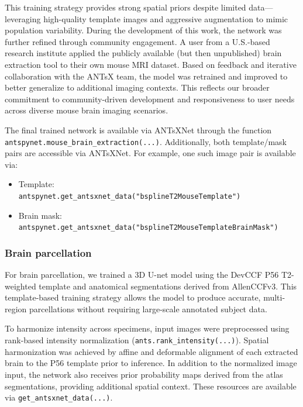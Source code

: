 \documentclass[
  12pt,
]{article}
\providecommand{\tightlist}{%
  \setlength{\itemsep}{0pt}\setlength{\parskip}{0pt}}
\begin{document}
This training strategy provides strong spatial priors despite limited
data---leveraging high-quality template images and aggressive
augmentation to mimic population variability. During the development of
this work, the network was further refined through community engagement.
A user from a U.S.-based research institute applied the publicly
available (but then unpublished) brain extraction tool to their own
mouse MRI dataset. Based on feedback and iterative collaboration with
the ANTsX team, the model was retrained and improved to better
generalize to additional imaging contexts. This reflects our broader
commitment to community-driven development and responsiveness to user
needs across diverse mouse brain imaging scenarios.

The final trained network is available via ANTsXNet through the
function\\
\texttt{antspynet.mouse\_brain\_extraction(...)}. Additionally, both
template/mask pairs are accessible via ANTsXNet. For example, one such
image pair is available via:

\begin{itemize}
\tightlist
\item
  Template:\\
  \texttt{antspynet.get\_antsxnet\_data("bsplineT2MouseTemplate")}
\item
  Brain mask:\\
  \texttt{antspynet.get\_antsxnet\_data("bsplineT2MouseTemplateBrainMask")}
\end{itemize}

\subsubsection{Brain parcellation}\label{brain-parcellation}

For brain parcellation, we trained a 3D U-net model using the DevCCF P56
T2-weighted template and anatomical segmentations derived from
AllenCCFv3. This template-based training strategy allows the model to
produce accurate, multi-region parcellations without requiring
large-scale annotated subject data.

To harmonize intensity across specimens, input images were preprocessed
using rank-based intensity normalization
(\texttt{ants.rank\_intensity(...)}). Spatial harmonization was achieved
by affine and deformable alignment of each extracted brain to the P56
template prior to inference. In addition to the normalized image input,
the network also receives prior probability maps derived from the atlas
segmentations, providing additional spatial context. These resources are
available via \texttt{get\_antsxnet\_data(...)}.
\end{document}
